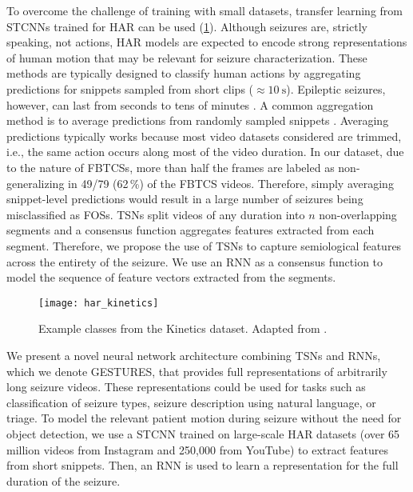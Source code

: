 To overcome the challenge of training with small datasets, transfer learning from \acp{STCNN} trained for \ac{HAR} can be used \cite{karacsony_deep_2020} (\cref{fig:kinetics}).
Although seizures are, strictly speaking, not actions, \ac{HAR} models are expected to encode strong representations of human motion that may be relevant for seizure characterization.
These methods are typically designed to classify human actions by aggregating predictions for snippets sampled from short clips ($\approx \SI{10}{\second}$).
Epileptic seizures, however, can last from seconds to tens of minutes \cite{jenssen_how_2006}.
A common aggregation method is to average predictions from randomly sampled snippets \cite{carreira_quo_2017,ghadiyaram_large-scale_2019,simonyan_two-stream_2014}.
Averaging predictions typically works because most video datasets considered are trimmed, i.e., the same action occurs along most of the video duration.
In our dataset, due to the nature of \acp{FBTCS}, more than half the frames are labeled as non-generalizing in 49/79 (62\,\%) of the \ac{FBTCS} videos.
Therefore, simply averaging snippet-level predictions would result in a large number of seizures being misclassified as \acp{FOS}.
\Acp{TSN} \cite{wang_temporal_2019} split videos of any duration into $n$ non-overlapping segments and a consensus function aggregates features extracted from each segment.
Therefore, we propose the use of \acp{TSN} to capture semiological features across the entirety of the seizure.
We use an \ac{RNN} as a consensus function to model the sequence of feature vectors extracted from the segments.

\begin{figure}[hbt!]
  \centering
  \texttt{[image: har\_kinetics]}
  \caption[Example classes from the Kinetics dataset]{
    Example classes from the Kinetics dataset.
    Adapted from \cite{kay_kinetics_2017}.
  }\label{fig:kinetics}
\end{figure}


We present a novel neural network architecture combining \acp{TSN} and \acp{RNN}, which we denote \ac{GESTURES}, that provides full representations of arbitrarily long seizure videos.
These representations could be used for tasks such as classification of seizure types, seizure description using natural language, or triage.
To model the relevant patient motion during seizure without the need for object detection, we use a \ac{STCNN} trained on large-scale \ac{HAR} datasets (over 65 million videos from Instagram and 250,000 from YouTube) \cite{ghadiyaram_large-scale_2019} to extract features from short snippets.
Then, an \ac{RNN} is used to learn a representation for the full duration of the seizure.

